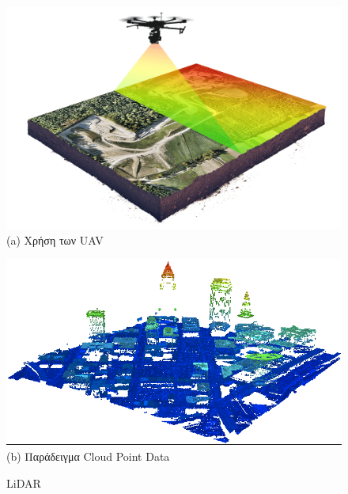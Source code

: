\begin{figure} [H]
	\centering
		\begin{minipage}{.47\textwidth}
			\centering
			\includegraphics[width=\linewidth]{../Images/Related-Work/lidar-drone-example.png}\\
			{(a) Χρήση των UAV }
		\end{minipage}%
		\hspace*{+0.8cm}
		\begin{minipage}{.47\textwidth}
			\centering
			\includegraphics[width=\linewidth]{../Images/Related-Work/lidar-cloud.png}\\
			{(b) Παράδειγμα Cloud Point Data }
		\end{minipage}
    \hfill \break
    \decoRule
	\caption[LiDAR]{LiDAR}
    \label{fig:drone-lidar}
\end{figure}

